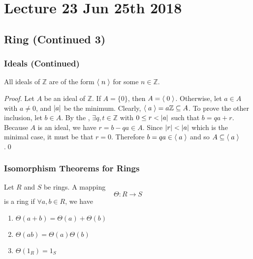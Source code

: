 \chapter{Lecture 23 Jun 25th 2018}%
\label{chp:lecture_23_jun_25th_2018}

\section{Ring (Continued 3)}%
\label{sec:ring_continued_3}

\subsection{Ideals (Continued)}%
\label{sub:ideals_continued}

\begin{propo}
\label{propo:ideals_of_z_are_principal_ideals}
  All ideals of $\mathbb{Z}$ are of the form $\langle \; n \; \rangle$ for some $n \in \mathbb{Z}$. 
\end{propo}

\begin{proof}
  Let $A$ be an ideal of $\mathbb{Z}$. If $A = \{0\}$, then $A = \langle \; 0 \; \rangle$. Otherwise, let $a \in A$ with $a \neq 0$, and $\left|a\right|$ be the minimum. Clearly, $\langle \; a \; \rangle = a \mathbb{Z} \subseteq A$. To prove the other inclusion, let $b \in A$. By the , $\exists q, t \in \mathbb{Z}$ with $0 \leq r < \left|a\right|$ such that $b = qa + r$. Because $A$ is an ideal, we have $r = b - qa \in A$. Since $\left|r\right| < \left|a\right|$ which is the minimal case, it must be that $r = 0$. Therefore $b = qa \in \langle \; a \; \rangle$ and so $A \subseteq \langle \; a \; \rangle$.\qed
\end{proof}


\subsection{Isomorphism Theorems for Rings}%
\label{sub:isomorphism_theorems_for_rings}

\begin{defn}
\label{defn:ring_homomorphism}
  Let $R$ and $S$ be rings. A mapping
  \begin{equation*}
    \Theta : R \to S
  \end{equation*}
  is a ring  if $\forall a, b \in R$, we have
  \begin{enumerate}
    \item $\Theta(a + b) = \Theta(a) + \Theta(b)$
    \item $\Theta(ab) = \Theta(a) \Theta(b)$
    \item $\Theta(1_R) = 1_S$
  \end{enumerate}
\end{defn}

